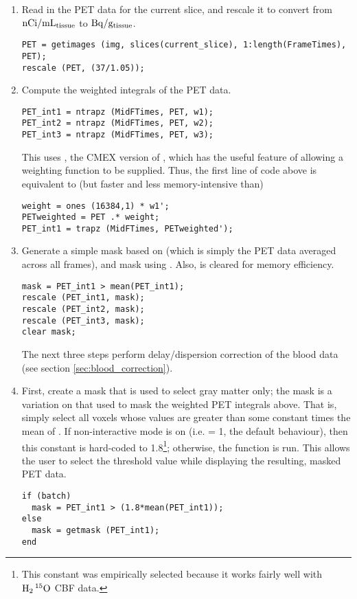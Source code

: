 \begin{enumerate}
\item Read in the PET data for the current slice, and rescale it
  to convert from ${\rm nCi/mL_{tissue}}$ to ${\rm Bq/g_{tissue}}$.
  \begin{verbatim}
PET = getimages (img, slices(current_slice), 1:length(FrameTimes), PET);
rescale (PET, (37/1.05));
  \end{verbatim}

\item Compute the weighted integrals of the PET data.
  \begin{verbatim}
PET_int1 = ntrapz (MidFTimes, PET, w1);
PET_int2 = ntrapz (MidFTimes, PET, w2);
PET_int3 = ntrapz (MidFTimes, PET, w3);
  \end{verbatim}

  This uses , the CMEX version of , which has
  the useful feature of allowing a weighting function to be supplied.
  Thus, the first line of code above is equivalent to (but faster and
  less memory-intensive than)
  \begin{verbatim}
weight = ones (16384,1) * w1';
PETweighted = PET .* weight;
PET_int1 = trapz (MidFTimes, PETweighted');
  \end{verbatim}

\item Generate a simple mask based on  (which is
  simply the PET data averaged across all frames), and mask using
  .  Also,  is cleared for memory efficiency.
  \begin{verbatim}
mask = PET_int1 > mean(PET_int1);
rescale (PET_int1, mask);
rescale (PET_int2, mask);
rescale (PET_int3, mask);
clear mask;
  \end{verbatim}

  The next three steps perform delay/dispersion correction of the
  blood data (see section \ref{sec:blood_correction}).  


\item First, create a mask that is used to select gray matter only;
  the mask is a variation on that used to mask the weighted PET
  integrals above.  That is, simply select all voxels whose values are
  greater than some constant times the mean of .  If
  non-interactive mode is on (i.e.   = 1, the default
  behaviour), then this constant is hard-coded to 1.8\footnote{This
    constant was empirically selected because it works fairly well
    with ${\rm H_{2}\,^{15}O}$ CBF data.}; otherwise, the function
   is run.  This allows the user to select the threshold
  value while displaying the resulting, masked PET data.
  \begin{verbatim}
if (batch)
  mask = PET_int1 > (1.8*mean(PET_int1));
else
  mask = getmask (PET_int1);
end
  \end{verbatim}


\end{enumerate}
